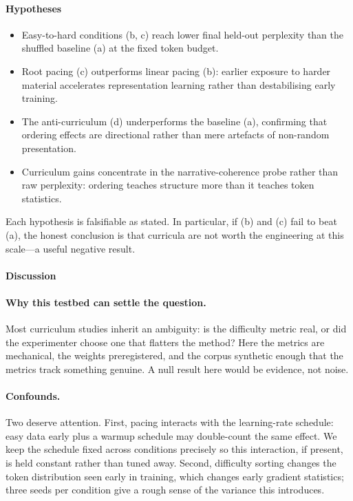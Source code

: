 \paragraph{Hypotheses}

\begin{itemize}
\item[\textbf{H1.}] Easy-to-hard conditions (b, c) reach lower final
held-out perplexity than the shuffled baseline (a) at the fixed token
budget.
\item[\textbf{H2.}] Root pacing (c) outperforms linear pacing (b): earlier
exposure to harder material accelerates representation learning rather
than destabilising early training.
\item[\textbf{H3.}] The anti-curriculum (d) underperforms the baseline
(a), confirming that ordering effects are directional rather than mere
artefacts of non-random presentation.
\item[\textbf{H4.}] Curriculum gains concentrate in the narrative-coherence
probe rather than raw perplexity: ordering teaches structure more than
it teaches token statistics.
\end{itemize}

Each hypothesis is falsifiable as stated. In particular, if (b) and (c)
fail to beat (a), the honest conclusion is that curricula are not worth
the engineering at this scale---a useful negative result.

\paragraph{Discussion}

\paragraph{Why this testbed can settle the question.} Most curriculum
studies inherit an ambiguity: is the difficulty metric real, or did the
experimenter choose one that flatters the method? Here the metrics are
mechanical, the weights preregistered, and the corpus synthetic enough
that the metrics track something genuine. A null result here would be
evidence, not noise.

\paragraph{Confounds.} Two deserve attention. First, pacing interacts
with the learning-rate schedule: easy data early plus a warmup schedule
may double-count the same effect. We keep the schedule fixed across
conditions precisely so this interaction, if present, is held constant
rather than tuned away. Second, difficulty sorting changes the token
distribution seen early in training, which changes early gradient
statistics; three seeds per condition give a rough sense of the variance
this introduces.

